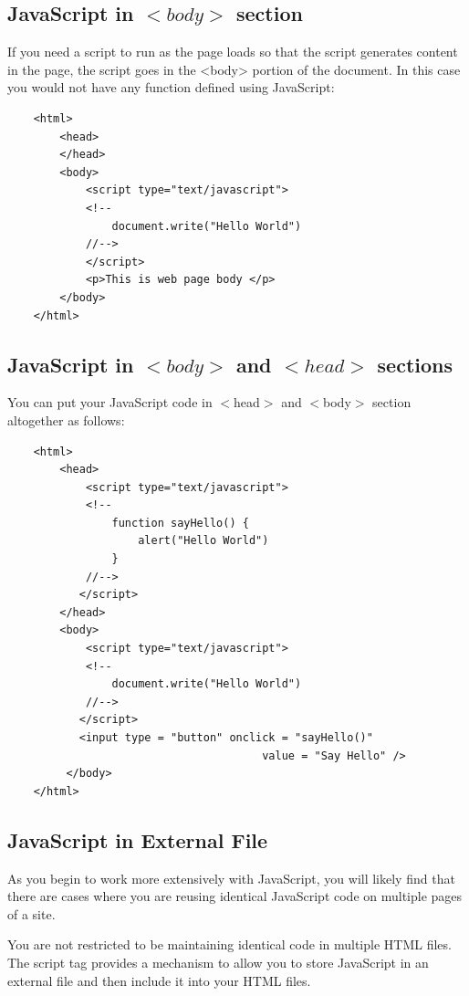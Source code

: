 \documentclass[11pt,a4paper]{article}
\begin{document}
\subsection*{JavaScript in $<body>$ section}

If you need a script to run as the page loads so that the script generates content in the page, the script goes in the <body> portion of the document. In this case you would not have any function defined using JavaScript:
\begin{verbatim}
    <html>
        <head>
        </head>
        <body>
            <script type="text/javascript">
            <!--
                document.write("Hello World")
            //-->
            </script>
            <p>This is web page body </p>
        </body>
    </html>
\end{verbatim}
\subsection*{JavaScript in $<body>$ and $<head>$ sections}

You can put your JavaScript code in $<$head$>$ and $<$body$>$ section altogether as follows:
\begin{verbatim}
    <html>
        <head>
            <script type="text/javascript">
            <!--
                function sayHello() {
                    alert("Hello World")
                }
            //-->
           </script>
        </head>
        <body>
            <script type="text/javascript">
            <!--
                document.write("Hello World")
            //-->
           </script>
           <input type = "button" onclick = "sayHello()"
                                       value = "Say Hello" />
         </body>
    </html>
\end{verbatim}

\subsection*{JavaScript in External File}

As you begin to work more extensively with JavaScript, you will likely find that there are cases where you are reusing identical JavaScript code on multiple pages of a site.

You are not restricted to be maintaining identical code in multiple HTML files. The script tag provides a mechanism to allow you to store JavaScript in an external file and then include it into your HTML files.
\end{document}
